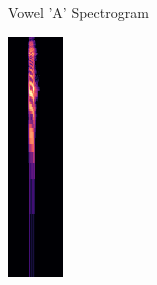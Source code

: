 \begin{figure}[htbp]
\begin{subfigure}[b]{0.19\textwidth}
        \caption{Vowel 'A' Spectrogram}
        \label{fig:vowel_a_spec}
    \end{subfigure}
    \hfill
    \begin{subfigure}[b]{0.19\textwidth}
        \includegraphics[width=\textwidth]{res/images/model/E.png}

\end{subfigure}
\end{figure}
